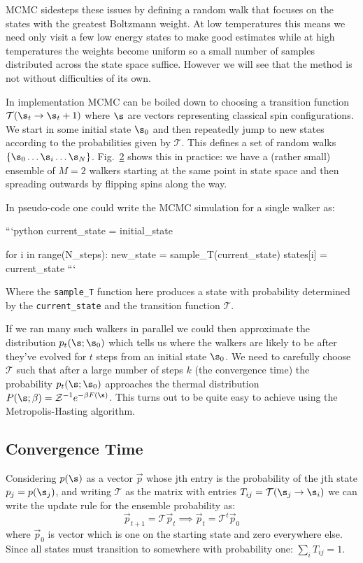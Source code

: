 {MCMC} sidesteps these issues by defining a random walk that focuses on the states with the greatest Boltzmann weight. At low temperatures this means we need only visit a few low energy states to make good estimates while at high temperatures the weights become uniform so a small number of samples distributed across the state space suffice. However we will see that the method is not without difficulties of its own.

In implementation {MCMC} can be boiled down to choosing a transition function \(\mathcal{T}(\s_{t} \rightarrow \s_t+1)\) where \(\s\) are vectors representing classical spin configurations. We start in some initial state \(\s_0\) and then repeatedly jump to new states according to the probabilities given by \(\mathcal{T}\). This defines a set of random walks \(\{\s_0\ldots \s_i\ldots \s_N\}\). Fig.~\protect\hyperlink{fig:single}{2} shows this in practice: we have a (rather small) ensemble of \(M = 2\) walkers starting at the same point in state space and then spreading outwards by flipping spins along the way.

In pseudo-code one could write the MCMC simulation for a single walker as:

```python current\_state = initial\_state

for i in range(N\_steps): new\_state = sample\_T(current\_state) states{[}i{]} = current\_state ```

Where the \texttt{sample\_T} function here produces a state with probability determined by the \texttt{current\_state} and the transition function \(\mathcal{T}\).

If we ran many such walkers in parallel we could then approximate the distribution \(p_t(\s; \s_0)\) which tells us where the walkers are likely to be after they've evolved for \(t\) steps from an initial state \(\s_0\). We need to carefully choose \(\mathcal{T}\) such that after a large number of steps \(k\) (the convergence time) the probability \(p_t(\s;\s_0)\) approaches the thermal distribution \(P(\s; \beta) = \mathcal{Z}^{-1} e^{-\beta F(\s)}\). This turns out to be quite easy to achieve using the Metropolis-Hasting algorithm.

\hypertarget{convergence-time}{%
\subsection{Convergence Time}\label{convergence-time}}

Considering \(p(\s)\) as a vector \(\vec{p}\) whose jth entry is the probability of the jth state \(p_j = p(\s_j)\), and writing \(\mathcal{T}\) as the matrix with entries \(T_{ij} = \mathcal{T}(\s_j \rightarrow \s_i)\) we can write the update rule for the ensemble probability as: \[\vec{p}_{t+1} = \mathcal{T} \vec{p}_t \implies \vec{p}_{t} = \mathcal{T}^t \vec{p}_0\] where \(\vec{p}_0\) is vector which is one on the starting state and zero everywhere else. Since all states must transition to somewhere with probability one: \(\sum_i T_{ij} = 1\).

